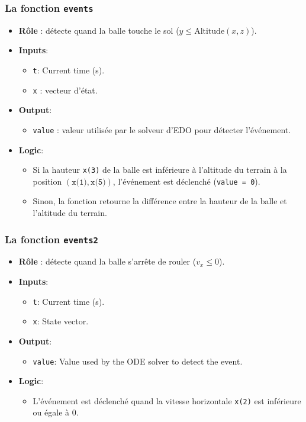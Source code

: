 \documentclass[10pt,a4paper]{report}
\begin{document}
\subsubsection{La fonction \texttt{events}}
\begin{itemize}
    \item \textbf{Rôle} : détecte quand la balle touche le sol (\(y \leq \text{Altitude}(x, z)\)).
    \item \textbf{Inputs}:
    \begin{itemize}
        \item \texttt{t}: Current time (s).
        \item \texttt{x} : vecteur d'état.
    \end{itemize}
    \item \textbf{Output}:
    \begin{itemize}
        \item \texttt{value} : valeur utilisée par le solveur d'EDO pour détecter l'événement.
    \end{itemize}
    \item \textbf{Logic}:
    \begin{itemize}
        \item Si la hauteur \texttt{x(3)} de la balle est inférieure à l'altitude du terrain à la position \((\texttt{x(1)}, \texttt{x(5)})\), l'événement est déclenché (\texttt{value = 0}).
        \item Sinon, la fonction retourne la différence entre la hauteur de la balle et l'altitude du terrain.
    \end{itemize}
\end{itemize}

\subsubsection{La fonction \texttt{events2}}
\begin{itemize}
    \item \textbf{Rôle} : détecte quand la balle s'arrête de rouler (\(v_x \leq 0\)).
    \item \textbf{Inputs}:
    \begin{itemize}
        \item \texttt{t}: Current time (s).
        \item \texttt{x}: State vector.
    \end{itemize}
    \item \textbf{Output}:
    \begin{itemize}
        \item \texttt{value}: Value used by the ODE solver to detect the event.
    \end{itemize}
    \item \textbf{Logic}:
    \begin{itemize}
        \item L'événement est déclenché quand la vitesse horizontale \texttt{x(2)} est inférieure ou égale à \(0\).
    \end{itemize}
\end{itemize}
\end{document}
